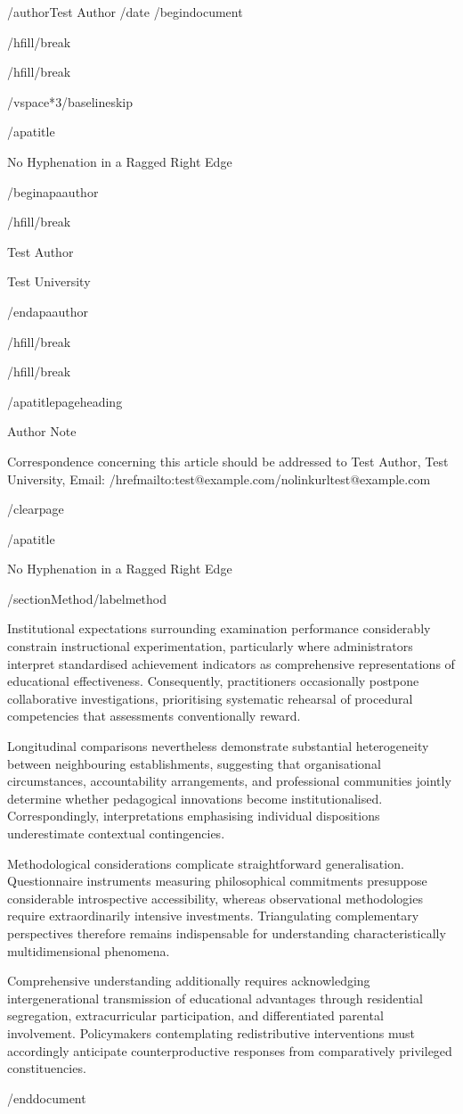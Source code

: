 /author{Test Author}
/date{}
/begin{document}


/hfill/break

/hfill/break

/vspace*{3/baselineskip}

/apatitle{

No Hyphenation in a Ragged Right Edge

}

/begin{apaauthor}

/hfill/break

Test Author

Test University

/end{apaauthor}

/hfill/break

/hfill/break

/apatitlepageheading{

Author Note

}

Correspondence concerning this article should be addressed to Test
Author, Test University, Email:
/href{mailto:test@example.com}{/nolinkurl{test@example.com}}

/clearpage

/apatitle{

No Hyphenation in a Ragged Right Edge

}

/section{Method}/label{method}

Institutional expectations surrounding examination performance
considerably constrain instructional experimentation, particularly where
administrators interpret standardised achievement indicators as
comprehensive representations of educational effectiveness.
Consequently, practitioners occasionally postpone collaborative
investigations, prioritising systematic rehearsal of procedural
competencies that assessments conventionally reward.

Longitudinal comparisons nevertheless demonstrate substantial
heterogeneity between neighbouring establishments, suggesting that
organisational circumstances, accountability arrangements, and
professional communities jointly determine whether pedagogical
innovations become institutionalised. Correspondingly, interpretations
emphasising individual dispositions underestimate contextual
contingencies.

Methodological considerations complicate straightforward generalisation.
Questionnaire instruments measuring philosophical commitments presuppose
considerable introspective accessibility, whereas observational
methodologies require extraordinarily intensive investments.
Triangulating complementary perspectives therefore remains indispensable
for understanding characteristically multidimensional phenomena.

Comprehensive understanding additionally requires acknowledging
intergenerational transmission of educational advantages through
residential segregation, extracurricular participation, and
differentiated parental involvement. Policymakers contemplating
redistributive interventions must accordingly anticipate
counterproductive responses from comparatively privileged
constituencies.




/end{document}
